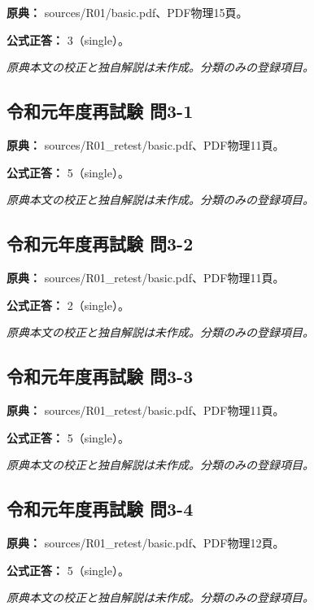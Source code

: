 \noindent\textbf{原典：} sources/R01/basic.pdf、PDF物理15頁。

\textbf{公式正答：} 3（single）。

\par\textit{原典本文の校正と独自解説は未作成。分類のみの登録項目。}

\subsection{令和元年度再試験 問3-1}
\label{q:r01-ret-basic-3-1}

\noindent\textbf{原典：} sources/R01\_retest/basic.pdf、PDF物理11頁。

\textbf{公式正答：} 5（single）。

\par\textit{原典本文の校正と独自解説は未作成。分類のみの登録項目。}

\subsection{令和元年度再試験 問3-2}
\label{q:r01-ret-basic-3-2}

\noindent\textbf{原典：} sources/R01\_retest/basic.pdf、PDF物理11頁。

\textbf{公式正答：} 2（single）。

\par\textit{原典本文の校正と独自解説は未作成。分類のみの登録項目。}

\subsection{令和元年度再試験 問3-3}
\label{q:r01-ret-basic-3-3}

\noindent\textbf{原典：} sources/R01\_retest/basic.pdf、PDF物理11頁。

\textbf{公式正答：} 5（single）。

\par\textit{原典本文の校正と独自解説は未作成。分類のみの登録項目。}

\subsection{令和元年度再試験 問3-4}
\label{q:r01-ret-basic-3-4}

\noindent\textbf{原典：} sources/R01\_retest/basic.pdf、PDF物理12頁。

\textbf{公式正答：} 5（single）。

\par\textit{原典本文の校正と独自解説は未作成。分類のみの登録項目。}


